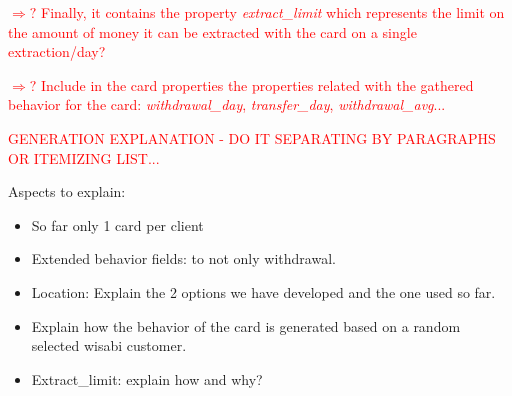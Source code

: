 \documentclass{article}
\begin{document}
\textcolor{red}{$\Rightarrow ?$ Finally, it contains the property \emph{extract\_limit}
which represents the limit on the amount of money it can be extracted with the card on a single 
extraction/day?}

\textcolor{red}{$\Rightarrow ?$ Include in the card properties the properties related with the
gathered behavior for the card: \emph{withdrawal\_day}, \emph{transfer\_day}, 
\emph{withdrawal\_avg}...}

\textcolor{red}{GENERATION EXPLANATION - DO IT SEPARATING BY PARAGRAPHS OR ITEMIZING LIST...}

\begin{tcolorbox}
  Aspects to explain:
  \begin{itemize}
    \item So far only 1 card per client
    \item Extended behavior fields: to not only withdrawal.
    \item Location: Explain the 2 options we have developed and the one used so far.
    \item Explain how the behavior of the card is generated based on a random
    selected wisabi customer.
    \item Extract\_limit: explain how and why?
  \end{itemize}
\end{tcolorbox}
\end{document}
